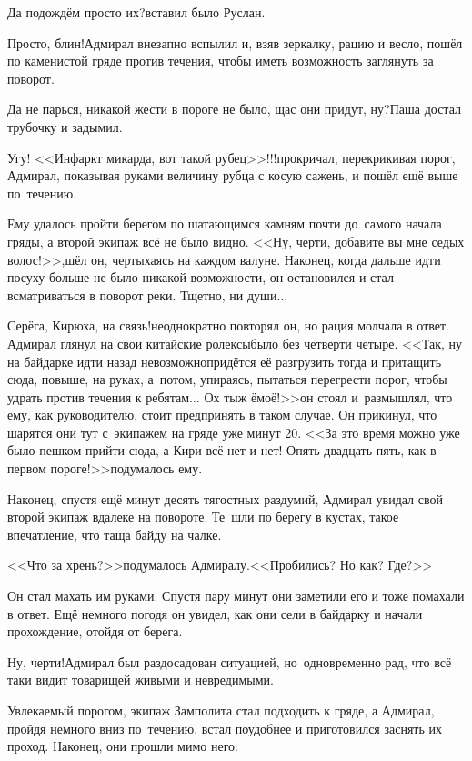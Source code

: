 \diagdash Да подождём просто их?\mdash вставил было Руслан.

\diagdash Просто, блин!\mdash Адмирал внезапно вспылил и, взяв зеркалку, рацию и весло, пошёл по каменистой гряде против течения, чтобы иметь возможность заглянуть за поворот.

\diagdash Да не парься, никакой жести в пороге не было, щас они придут, ну?\mdash Паша достал трубочку и задымил.

\diagdash Угу! <<Инфаркт микарда, вот такой рубец>>!!!\mdash прокричал, перекрикивая порог, Адмирал, показывая руками величину рубца с косую сажень, и пошёл ещё выше по~течению.

Ему удалось пройти берегом по шатающимся камням почти до~самого начала гряды, а второй экипаж всё не было видно. <<Ну, черти, добавите вы мне седых волос!>>,\mdash шёл он, чертыхаясь на каждом валуне. Наконец, когда дальше идти посуху больше не было никакой возможности, он остановился и стал всматриваться в поворот реки. Тщетно, ни души$\ldots$

\diagdash Серёга, Кирюха, на связь!\mdash неоднократно повторял он, но рация молчала в ответ. Адмирал глянул на свои китайские ролексы\mdash было без четверти четыре. <<Так, ну на байдарке идти назад невозможно\mdash придётся её разгрузить тогда и притащить сюда, повыше, на руках, а~потом, упираясь, пытаться перегрести порог, чтобы удрать против течения к ребятам$\ldots$ Ох тыж ё\sdash моё!>>\mdash он стоял и~размышлял, что ему, как руководителю, стоит предпринять в таком случае. Он прикинул, что шарятся они тут с~экипажем на гряде уже минут 20. <<За это время можно уже было пешком прийти сюда, а Кири всё нет и нет! Опять двадцать пять, как в первом пороге!>>\mdash подумалось ему.

Наконец, спустя ещё минут десять тягостных раздумий, Адмирал увидал свой второй экипаж вдалеке на повороте. Те~шли по берегу в кустах, такое впечатление, что таща байду на чалке. 

<<Что за хрень?>>\mdash подумалось Адмиралу.\mdash <<Пробились? Но как? Где?>>

Он стал махать им руками. Спустя пару минут они заметили его и тоже помахали в ответ. Ещё немного погодя он увидел, как они сели в байдарку и начали прохождение, отойдя от берега.

\diagdash Ну, черти!\mdash Адмирал был раздосадован ситуацией, но~одновременно рад, что всё таки видит товарищей живыми и невредимыми.

Увлекаемый порогом, экипаж Замполита стал подходить к гряде, а Адмирал, пройдя немного вниз по~течению, встал поудобнее и приготовился заснять их проход. Наконец, они прошли мимо него:

